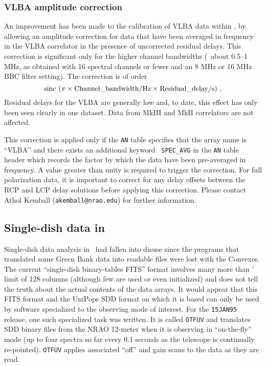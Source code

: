 \eject
\subsubsection{VLBA amplitude correction}

An improvement has been made to the calibration of VLBA data within
\AIPS, by allowing an amplitude correction for data that have been
averaged in frequency in the VLBA correlator in the presence of
uncorrected residual delays.  This correction is significant only for
the higher channel bandwidths (\eg\ about 0.5--1 MHz, as obtained with
16 spectral channels or fewer and an 8 MHz or 16 MHz BBC filter
setting).  The correction is of order
$$
     \hbox{sinc}\, \left(\pi \times \hbox{Channel\_bandwidth/Hz} \times
            \hbox{Residual\_delay/s} \right) \, .
$$
Residual delays for the VLBA are generally low and, to date, this
effect has only been seen clearly in one dataset.  Data from MkIII and
MkII correlators are not affected.

This correction is applied only if the {\tt AN} table specifies that the
array name is ``VLBA'' and there exists an additional keyword {\tt
SPEC\_AVG} in the {\tt AN} table header which records the factor by
which the data have been pre-averaged in frequency.  A value greater
than unity is required to trigger the correction.  For full
polarization data, it is important to correct for any delay offsets
between the RCP and LCP delay solutions before applying this
correction.  Please contact Athol Kemball ({\tt akemball@nrao.edu})
for further information.

\subsection{Single-dish data in \AIPS}

Single-dish data analysis in \AIPS\ had fallen into disuse since the
programs that translated some Green Bank data into readable files were
lost with the Convexes.  The current ``single-dish binary-tables
FITS'' format involves many more than \AIPS' limit of 128 columns
(although few are used or even initialized) and does not tell the
truth about the actual contents of the data arrays.  It would appear
that this FITS format and the UniPops SDD format on which it is based
can only be used by software specialized to the observing mode of
interest.  For the {\tt 15JAN95} release, one such specialized task
was written.  It is called {\tt OTFUV} and translates SDD binary files
from the NRAO 12-meter when it is observing in ``on-the-fly'' mode (up
to four spectra so far every 0.1 seconds as the telescope is
continually re-pointed).  {\tt OTFUV} applies associated ``off'' and
gain scans to the data as they are read.


